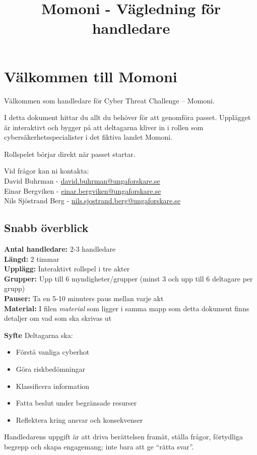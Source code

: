 \documentclass{article}
\title{Momoni - Vägledning för handledare}
\date{}
\begin{document}
\maketitle

\section{Välkommen till Momoni}
Välkommen som handledare för Cyber Threat Challenge – Momoni. 

I detta dokument hittar du allt du behöver för att genomföra passet. Upplägget är interaktivt och bygger på att deltagarna kliver in i rollen som cybersäkerhetsspecialister i det fiktiva landet Momoni. 

Rollspelet börjar direkt när passet startar. 

Vid frågor kan ni kontakta: \\
  David Buhrman - \href{mailto:david.buhrman@ungaforskare.se}{david.buhrman@ungaforskare.se} \\
  Einar Bergviken - \href{mailto:einar.bergviken@ungaforskare.se}{einar.bergviken@ungaforskare.se} \\
  Nils Sjöstrand Berg - \href{mailto:nils.sjostrand.berg@ungaforskare.se}{nils.sjostrand.berg@ungaforskare.se}

\subsection{Snabb överblick}
\textbf{Antal handledare:} 2-3 handledare \\
\textbf{Längd:} 2 timmar \\
\textbf{Upplägg:} Interaktivt rollspel i tre akter \\
\textbf{Grupper:} Upp till 6 myndigheter/grupper (minst 3 och upp till 6 deltagare per grupp) \\
\textbf{Pauser:} Ta en 5-10 minuters paus mellan varje akt \\
\textbf{Material:} I filen \textit{material} som ligger i samma mapp som detta dokument finns detaljer om vad som ska skrivas ut

\textbf{Syfte}
Deltagarna ska:
\begin{itemize}
    \item Förstå vanliga cyberhot
    \item Göra riskbedömningar
    \item Klassificera information
    \item Fatta beslut under begränsade resurser
    \item Reflektera kring ansvar och konsekvenser
\end{itemize}
Handledarens uppgift är att driva berättelsen framåt, ställa frågor, förtydliga begrepp och skapa engagemang; inte bara att ge “rätta svar”.
\end{document}
